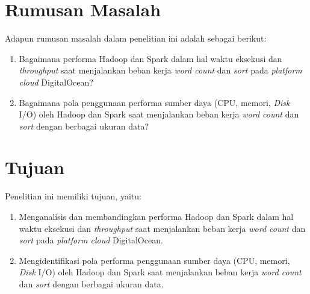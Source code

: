 \section{Rumusan Masalah}
Adapun rumusan masalah dalam penelitian ini adalah sebagai berikut:
\begin{enumerate}
\item Bagaimana performa Hadoop dan Spark dalam hal waktu eksekusi dan \textit{throughput} saat menjalankan beban kerja \textit{word count} dan \textit{sort} pada \textit{platform cloud} DigitalOcean?
\item Bagaimana pola penggunaan performa sumber daya (CPU, memori, \textit{Disk} I/O) oleh Hadoop dan Spark saat menjalankan beban kerja \textit{word count} dan \textit{sort} dengan berbagai ukuran data?
\end{enumerate}

\section{Tujuan}
Penelitian ini memiliki tujuan, yaitu:
\begin{enumerate}
\item Menganalisis dan membandingkan performa Hadoop dan Spark dalam hal waktu eksekusi dan \textit{throughput} saat menjalankan beban kerja \textit{word count} dan \textit{sort} pada \textit{platform cloud} DigitalOcean.
\item Mengidentifikasi pola performa penggunaan sumber daya (CPU, memori, \textit{Disk} I/O) oleh Hadoop dan Spark saat menjalankan beban kerja \textit{word count} dan \textit{sort} dengan berbagai ukuran data.
\end{enumerate}


